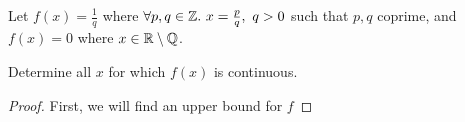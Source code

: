 \documentclass[../hw2]{subfiles}
\begin{document}
\begin{problem}[2]
Let $f(x)=\frac{1}{q}$ where $\forall p,q\in \Z.\ x=\frac{p}{q},\ q>0$ such that $p,q$ coprime, and $f(x)=0$ where $x\in \mathbb{R}\setminus\mathbb{Q}$.

Determine all $x$ for which  $f(x)$ is continuous.
\end{problem}

\begin{proof}
	First, we will find an upper bound for $f$
\end{proof}
\end{document}
